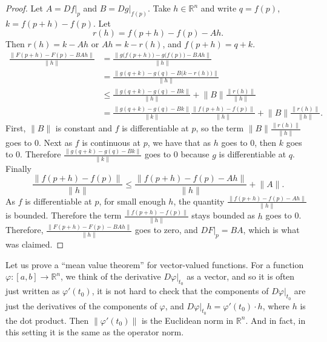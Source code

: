 \documentclass[12pt,openany]{book}
\newcommand{\snorm}[1]{\lVert {#1} \rVert}
\newcommand{\R}{{\mathbb{R}}}
\theoremstyle{plain}
\theoremstyle{remark}
\theoremstyle{definition}
\theoremstyle{exercise}
\theoremstyle{example}
\begin{document}
\begin{proof}
Let $A = Df|_p$ and $B = Dg|_{f(p)}$.  Take $h \in \R^n$
and write $q = f(p)$, $k = f(p+h)-f(p)$.  Let
\begin{equation*}
r(h) = f(p+h)-f(p) - A h . %
\end{equation*}
Then $r(h) = k-Ah$ or $Ah = k-r(h)$, and $f(p+h) = q+k$.
\begin{equation*}
\begin{split}
\frac{\snorm{F(p+h)-F(p) - BAh}}{\snorm{h}}
& =
\frac{\snorm{g\bigl(f(p+h)\bigr)-g\bigl(f(p)\bigr) - BAh}}{\snorm{h}}
\\
& =
\frac{\snorm{g(q+k)-g(q) - B\bigl(k-r(h)\bigr)}}{\snorm{h}}
\\
& \leq
\frac
{\snorm{g(q+k)-g(q) - Bk}}
{\snorm{h}}
+
\snorm{B}
\frac
{\snorm{r(h)}}
{\snorm{h}}
\\
& =
\frac
{\snorm{g(q+k)-g(q) - Bk}}
{\snorm{k}}
\frac
{\snorm{f(p+h)-f(p)}}
{\snorm{h}}
+
\snorm{B}
\frac
{\snorm{r(h)}}
{\snorm{h}} .
\end{split}
\end{equation*}
First, $\snorm{B}$ is constant and $f$ is differentiable at $p$,
so
the term $\snorm{B}\frac{\snorm{r(h)}}{\snorm{h}}$ goes to 0.
Next as $f$ is continuous at $p$, we have that as 
$h$ goes to 0, then $k$ goes to 0.  Therefore
$\frac
{\snorm{g(q+k)-g(q) - Bk}}
{\snorm{k}}$ goes to 0 because $g$ is differentiable at $q$.
Finally 
\begin{equation*}
\frac
{\snorm{f(p+h)-f(p)}}
{\snorm{h}}
\leq
\frac
{\snorm{f(p+h)-f(p)-Ah}}
{\snorm{h}}
+
\snorm{A} .
\end{equation*}
As $f$ is differentiable at $p$,
for small enough $h$, the quantity
$\frac{\snorm{f(p+h)-f(p)-Ah}}{\snorm{h}}$ is bounded.  Therefore the
term
$
\frac
{\snorm{f(p+h)-f(p)}}
{\snorm{h}}
$
stays bounded as $h$ goes to 0.  Therefore, 
$\frac{\snorm{F(p+h)-F(p) - BAh}}{\snorm{h}}$ goes to zero, and
$DF|_p = BA$, which is what was claimed.
\end{proof}

Let us prove a ``mean value theorem'' for vector-valued functions.
For a function $\varphi \colon [a,b] \to \R^n$, we think of the derivative
$D\varphi|_{t_0}$ as a vector, and so 
it is often just written as $\varphi'(t_0)$, it is not hard to check that
the components of $D\varphi|_{t_0}$ are just the derivatives of the
components of $\varphi$, and $D\varphi|_{t_0} h = \varphi'(t_0) \cdot h$,
where $h$ is the dot product.  Then
$\snorm{\varphi'(t_0)}$
is the Euclidean norm in $\R^n$.  And in fact, in this setting it is the same
as the operator norm.
\end{document}
